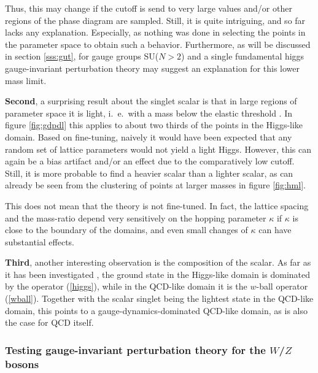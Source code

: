 \documentclass[final,twoside,12pt]{article}
\newcommand*{\pref}[1]{(\ref{#1})}
\newcommand*{\1}{1\!\!\!\bot}
\begin{document}
Thus, this may change if the cutoff is send to very large values and/or other regions of the phase diagram are sampled. Still, it is quite intriguing, and so far lacks any explanation. Especially, as nothing was done in selecting the points in the parameter space to obtain such a behavior. Furthermore, as will be discussed in section \ref{sss:gut}, for gauge groups SU($N>2$) and a single fundamental higgs gauge-invariant perturbation theory may suggest an explanation for this lower mass limit.

{\bf Second}, a surprising result about the singlet scalar is that in large regions of parameter space it is light, i.\ e.\ with a mass below the elastic threshold \cite{Wurtz:2013ova,Maas:2013aia,Maas:2014pba,Maas:2012tj,Evertz:1986vp,Evertz:1985fc,Langguth:1985eu,Langguth:1985dr}. In figure \ref{fig:gdpdl} this applies to about two thirds of the points in the Higgs-like domain. Based on fine-tuning, naively it would have been expected that any random set of lattice parameters would not yield a light Higgs. However, this can again be a bias artifact and/or an effect due to the comparatively low cutoff. Still, it is more probable to find a heavier scalar than a lighter scalar, as can already be seen from the clustering of points at larger masses in figure \ref{fig:hml}.

This does not mean that the theory is not fine-tuned. In fact, the lattice spacing and the mass-ratio depend very sensitively on the hopping parameter $\kappa$ if $\kappa$ is close to the boundary of the domains, and even small changes of $\kappa$ can have substantial effects.

{\bf Third}, another interesting observation is the composition of the scalar. As far as it has been investigated \cite{Maas:2014pba,Wurtz:2013ova}, the ground state in the Higgs-like domain is dominated by the operator \pref{higgs}, while in the QCD-like domain it is the $w$-ball operator \pref{wball}. Together with the scalar singlet being the lightest state in the QCD-like domain, this points to a gauge-dynamics-dominated QCD-like domain, as is also the case for QCD itself.

\subsubsection{Testing gauge-invariant perturbation theory for the $W$/$Z$ bosons}\label{sss:w}
\end{document}
